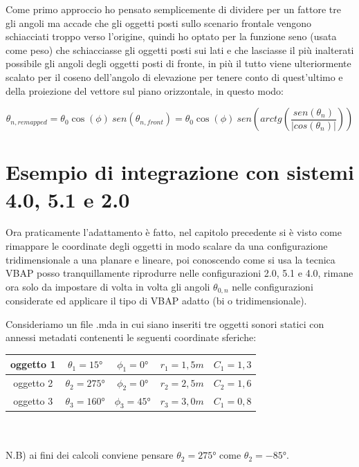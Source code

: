 \documentclass[12pt,a4paper]{report}
\begin{document}
Come primo approccio ho pensato semplicemente di dividere per un fattore tre gli angoli ma accade che gli oggetti posti sullo scenario frontale vengono schiacciati troppo verso l'origine, quindi ho optato per la funzione seno (usata come peso) che schiacciasse gli oggetti posti sui lati e che lasciasse il più inalterati possibile gli angoli degli oggetti posti di fronte, in più il tutto viene ulteriormente scalato per il coseno dell'angolo di elevazione per tenere conto di quest'ultimo e della proiezione del vettore sul piano orizzontale, in questo modo:

\begin{equation}
\theta_{n, remapped}= \theta_0 \cos(\phi) \ sen (\theta_{n,front}) = \theta_0 \cos(\phi)\ sen \left( arctg  \left( \dfrac{sen(\theta_n)}{\vert cos(\theta_n)\vert } \right)\right)
\label{mmmm}
\end{equation}

\section{Esempio di integrazione con sistemi 4.0, 5.1 e 2.0}

Ora praticamente l'adattamento è fatto, nel capitolo precedente si è visto come rimappare le coordinate degli oggetti in modo scalare da una configurazione tridimensionale a una planare e lineare, poi conoscendo come si usa la tecnica VBAP posso tranquillamente riprodurre nelle configurazioni 2.0, 5.1 e 4.0, rimane ora solo da impostare di volta in volta gli angoli $\theta_{0,n}$ nelle configurazioni considerate ed applicare il tipo di VBAP adatto (bi o tridimensionale).

Consideriamo un file .mda in cui siano inseriti tre oggetti sonori statici con annessi metadati contenenti le seguenti coordinate sferiche:\\

\begin{tabular}{|c|c|c|c|c|}
\hline
oggetto 1 & $\theta_1=15°$ & $\phi_1=0°$ & $r_1=1,5m$ & $C_1=1,3$ \\
\hline
oggetto 2 & $\theta_2=275°$ & $\phi_2=0°$ & $r_2=2,5m$ & $C_2=1,6$ \\
\hline
oggetto 3 & $\theta_3=160°$ & $\phi_3=45°$ & $r_3=3,0m$ & $C_1=0,8$ \\
\hline

\end{tabular} \\ \\

N.B) ai fini dei calcoli conviene pensare $\theta_2=275°$ come $\theta_2=-85°$.\\
\end{document}
